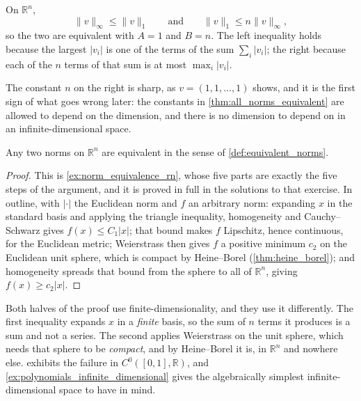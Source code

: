 \begin{example}
\label{ex:one_norm_vs_max_norm}
On $\mathbb{R}^n$,
\[\|v\|_\infty \leq \|v\|_1 \qquad\text{and}\qquad \|v\|_1 \leq n\|v\|_\infty,\]
so the two are equivalent with $A = 1$ and $B = n$. The left inequality holds because the largest
$|v_i|$ is one of the terms of the sum $\sum_i|v_i|$; the right because each of the $n$ terms of
that sum is at most $\max_i|v_i|$.

The constant $n$ on the right is sharp, as $v = (1,1,\dots,1)$ shows, and it is the first sign of
what goes wrong later: the constants in \cref{thm:all_norms_equivalent} are allowed to depend on
the dimension, and there is no dimension to depend on in an infinite-dimensional space.
\end{example}

\begin{theorem}
\label{thm:all_norms_equivalent}
Any two norms on $\mathbb{R}^n$ are equivalent in the sense of \cref{def:equivalent_norms}.
\end{theorem}

\begin{proof}
This is \cref{ex:norm_equivalence_rn}, whose five parts are exactly the five steps of the argument, and it is
proved in full in the solutions to that exercise. In outline, with $|\cdot|$ the Euclidean norm
and $f$ an arbitrary norm: expanding $x$ in the standard basis and applying the triangle
inequality, homogeneity and Cauchy--Schwarz gives $f(x) \leq C_1|x|$; that bound makes $f$
Lipschitz, hence continuous, for the Euclidean metric; Weierstrass then gives $f$ a positive
minimum $c_2$ on the Euclidean unit sphere, which is compact by Heine--Borel
(\cref{thm:heine_borel}); and homogeneity spreads that bound from the sphere to all of
$\mathbb{R}^n$, giving $f(x) \geq c_2|x|$.
\end{proof}

\begin{remark}
\label{rem:where_finite_dimension_enters}
Both halves of the proof use finite-dimensionality, and they use it differently. The first
inequality expands $x$ in a \emph{finite} basis, so the sum of $n$ terms it produces is a sum and
not a series. The second applies Weierstrass on the unit sphere, which needs that sphere to be
\emph{compact}, and by Heine--Borel it is, in $\mathbb{R}^n$ and nowhere else.
 exhibits the failure in
$C^0([0,1],\mathbb{R})$, and \cref{ex:polynomials_infinite_dimensional} gives the algebraically
simplest infinite-dimensional space to have in mind.
\end{remark}

